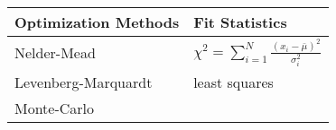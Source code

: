 \centering
\begin{tabular}{ll}
    \toprule
    Optimization Methods                & Fit Statistics \\
    \midrule
    Nelder-Mead & $\chi^{2} = \sum_{i=1}^{N} \frac{(x_{i} - \overline{\mu})^{2}}{\sigma_{i}^{2}}$  \\
    Levenberg-Marquardt & least squares\\
    Monte-Carlo\tnote{a} & \\
    \bottomrule
\end{tabular}